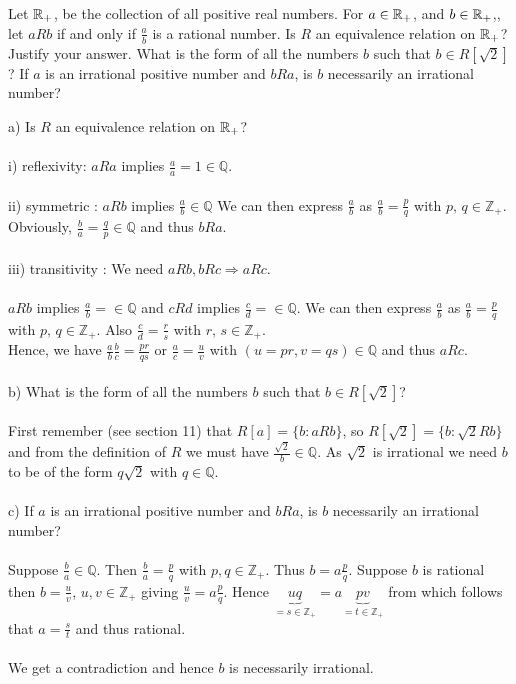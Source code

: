 \subsection{}
\begin{tcolorbox}
Let $\mathbb{R}_{+}$, be the collection of all positive real numbers. For $a \in \mathbb{R}_{+}$, and $b \in \mathbb{R}_{+} $,, let $a R b$ if and only if $\frac{a}{b}$ is a rational number. Is $R$ an equivalence relation on $\mathbb{R}_{+}$? Justify your answer. What is the form of all the numbers $b$ such that $b \in R[\sqrt{2}]$? If $a$ is an irrational positive number and $b R a$, is $b$ necessarily an irrational number? 
\end{tcolorbox}
$$ $$
a) Is $R$ an equivalence relation on $\mathbb{R}_{+}$?\\\\
i) reflexivity: $aRa$ implies $\frac{a}{a}=1\in \mathbb{Q}$.\\\\
ii) symmetric : $aRb$ implies $\frac{a}{b}\in \mathbb{Q}$ We can then express $\frac{a}{b}$ as $\frac{a}{b} =\frac{p}{q}$ with $p,\, q\in \mathbb{Z}_{+}$. Obviously, $\frac{b}{a} =\frac{q}{p}\in \mathbb{Q} $ and thus $bRa$.\\\\
iii) transitivity : We need $aRb, bRc\Rightarrow aRc$.\\\\
$aRb$ implies $\frac{a}{b}=\in \mathbb{Q}$ and  $cRd$ implies $\frac{c}{d}=\in \mathbb{Q}$. We can then express $\frac{a}{b}$ as $\frac{a}{b} =\frac{p}{q}$ with $p,\, q\in \mathbb{Z}_{+}$. Also $\frac{c}{d} =\frac{r}{s}$ with $r,\, s\in \mathbb{Z}_{+}$.\\
Hence, we have $\frac{a}{b}\frac{b}{c} = \frac{pr}{qs}$ or $\frac{a}{c}= \frac{u}{v}$ with $(u=pr,v=qs) \in \mathbb{Q} $ and thus $aRc$.\\\\
b) What is the form of all the numbers $b$ such that $b\in R[\sqrt{2}]$?\\\\
First remember (see section 11) that $R[a]=\{ b:aRb\}$, so $R[\sqrt{2}]=\{ b:\sqrt{2}Rb\}$ and from the definition of $R$  we must have $\frac{\sqrt{2}}{b}\in\mathbb{Q}$. As $\sqrt{2}$ is irrational we need $b$ to be of the form $q \sqrt{2}$ with $q\in \mathbb{Q}$.\\\\
c) If $a$ is an irrational positive number and $b R a$, is $b$ necessarily an irrational number? \\\\
Suppose $\frac{b}{a}\in \mathbb{Q}$. Then $\frac{b}{a}= \frac{p}{q}$ with $p,q \in \mathbb{Z}_{+}$. Thus $ b= a\frac{p}{q}$. Suppose $b$ is rational then $ b = \frac{u}{v}$, $u,v\in \mathbb{Z}_{+}$ giving $\frac{u}{v}=a\frac{p}{q}$. Hence $ \underbrace{uq}_{=s\in \mathbb{Z}_{+}}=a\underbrace{pv}_{=t\in \mathbb{Z}_{+}}$ from which follows that $a= \frac{s}{t}$ and thus rational.\\\\
 We get a contradiction and hence $b$ is necessarily irrational.

